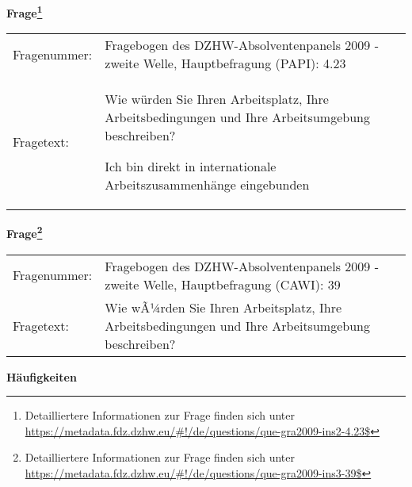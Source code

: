 				\vspace*{0.5cm}
                \noindent\textbf{Frage\footnote{Detailliertere Informationen zur Frage finden sich unter
		              \url{https://metadata.fdz.dzhw.eu/\#!/de/questions/que-gra2009-ins2-4.23$}}}\\
				\begin{tabularx}{\hsize}{@{}lX}
					Fragenummer: &
					  Fragebogen des DZHW-Absolventenpanels 2009 - zweite Welle, Hauptbefragung (PAPI):
					  4.23
 \\
					Fragetext: & Wie würden Sie Ihren Arbeitsplatz, Ihre Arbeitsbedingungen und Ihre Arbeitsumgebung beschreiben?\par  Ich bin direkt in internationale Arbeitszusammenhänge eingebunden \\
				\end{tabularx}
				\vspace*{0.5cm}
                \noindent\textbf{Frage\footnote{Detailliertere Informationen zur Frage finden sich unter
		              \url{https://metadata.fdz.dzhw.eu/\#!/de/questions/que-gra2009-ins3-39$}}}\\
				\begin{tabularx}{\hsize}{@{}lX}
					Fragenummer: &
					  Fragebogen des DZHW-Absolventenpanels 2009 - zweite Welle, Hauptbefragung (CAWI):
					  39
 \\
					Fragetext: & Wie wÃ¼rden Sie Ihren Arbeitsplatz, Ihre Arbeitsbedingungen und Ihre Arbeitsumgebung beschreiben? \\
				\end{tabularx}





        		\vspace*{0.5cm}
                \noindent\textbf{Häufigkeiten}

